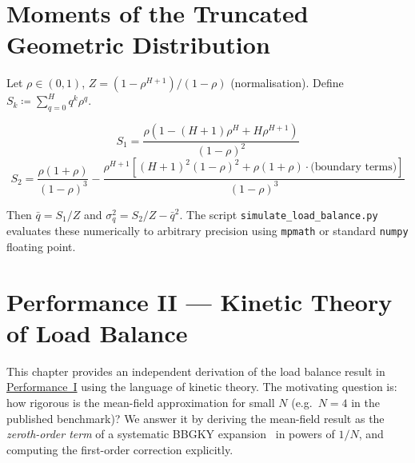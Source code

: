 \documentclass[11pt,a4paper]{article}
\begin{document}
\appendix
\section{Moments of the Truncated Geometric Distribution}

Let $\rho \in (0,1)$, $Z = (1-\rho^{H+1})/(1-\rho)$ (normalisation).
Define $S_k \coloneqq \sum_{q=0}^{H} q^k \rho^q$.

\[
  S_1 = \frac{\rho(1-(H+1)\rho^H + H\rho^{H+1})}{(1-\rho)^2}
\]
\[
  S_2 = \frac{\rho(1+\rho)}{(1-\rho)^3}
        - \frac{\rho^{H+1}[(H+1)^2(1-\rho)^2 + \rho(1+\rho) \cdot \text{(boundary terms)}]}{(1-\rho)^3}
\]

Then $\bar{q} = S_1/Z$ and $\sigma_q^2 = S_2/Z - \bar{q}^2$.
The script \texttt{simulate\_load\_balance.py} evaluates these
numerically to arbitrary precision using \texttt{mpmath} or
standard \texttt{numpy} floating point.



\renewcommand{\thesection}{\arabic{section}}
\renewcommand{\thesubsection}{\arabic{section}.\arabic{subsection}}
\setcounter{section}{0}

\section*{Performance II --- Kinetic Theory of Load Balance}
\label{chap:kinetic_theory}

\setcounter{section}{0}

This chapter provides an independent derivation of the load balance result in
\hyperref[chap:load_balance]{Performance~I} using the language of kinetic theory.
The motivating question is: how rigorous is the mean-field approximation for
small $N$ (e.g.\ $N=4$ in the published benchmark)?
We answer it by deriving the mean-field result as the
\emph{zeroth-order term} of a systematic BBGKY expansion~\cite{bogoliubov1946,born_green1949,kirkwood1946,yvon1935} in powers of $1/N$,
and computing the first-order correction explicitly.
\end{document}

